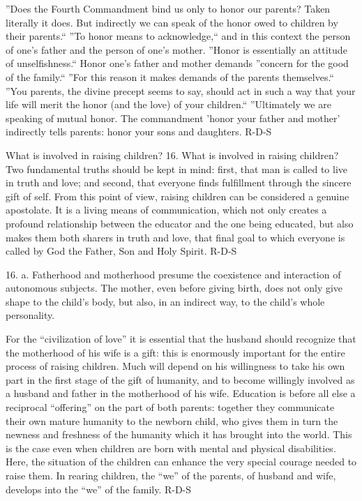 \documentclass[oneside]{book}
\begin{document}
''Does the Fourth Commandment bind us only to honor our parents? Taken literally
it does. But indirectly we can speak of the honor owed to children by their
parents.`` ''To honor means to acknowledge,`` and in this context the person of
one's father and the person of one's mother. ''Honor is essentially an attitude
of unselfishness.`` Honor one's father and mother demands ''concern for the good
of the family.`` ''For this reason it makes demands of the parents themselves.``
''You parents, the divine precept seems to say, should act in such a way that
your life will merit the honor (and the love) of your children.`` ''Ultimately
we are speaking of mutual honor. The commandment 'honor your father and mother'
indirectly tells parents: honor your sons and daughters.
R-D-S

What is involved in raising children?
16. What is involved in raising children? Two fundamental truths should be kept
in mind: first, that man is called to live in truth and love; and second, that
everyone finds fulfillment through the sincere gift of self. From this point of
view, raising children can be considered a genuine apostolate. It is a living
means of communication, which not only creates a profound relationship between
the educator and the one being educated, but also makes them both sharers in
truth and love, that final goal to which everyone is called by God the Father,
Son and Holy Spirit.
R-D-S

16. a. Fatherhood and motherhood presume the coexistence and interaction of
autonomous subjects. The mother, even before giving birth, does not only give
shape to the child's body, but also, in an indirect way, to the child's whole
personality.

For the ``civilization of love'' it is essential that the husband should
recognize that the motherhood of his wife is a gift: this is enormously
important for the entire process of raising children. Much will depend on his
willingness to take his own part in the first stage of the gift of humanity, and
to become willingly involved as a husband and father in the motherhood of his
wife. Education is before all else a reciprocal ``offering'' on the part of both
parents: together they communicate their own mature humanity to the newborn
child, who gives them in turn the newness and freshness of the humanity which it
has brought into the world. This is the case even when children are born with
mental and physical disabilities. Here, the situation of the children can
enhance the very special courage needed to raise them. In rearing children, the
``we'' of the parents, of husband and wife, develops into the ``we'' of the
family.
R-D-S
\end{document}
